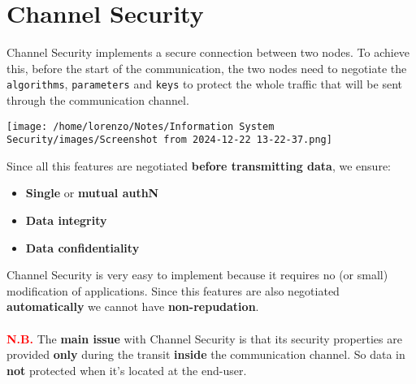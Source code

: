 \section{Channel Security}
\begin{minipage}{0.7\textwidth}
Channel Security implements a secure connection between two nodes. To achieve this, before the start of the communication, the two nodes need to negotiate the \texttt{algorithms}, \texttt{parameters} and \texttt{keys} to protect the whole traffic that will be sent through the communication channel.
\end{minipage} 
\hspace{0.5cm}
\begin{minipage}{0.3\textwidth}
    \centering
    \texttt{[image: /home/lorenzo/Notes/Information System Security/images/Screenshot from 2024-12-22 13-22-37.png]}
\end{minipage}
\noindent
Since all this features are negotiated \textbf{before transmitting data}, we ensure:
\begin{itemize}
    \item \textbf{Single} or \textbf{mutual authN}
    \item \textbf{Data integrity}
    \item \textbf{Data confidentiality}
\end{itemize}
Channel Security is very easy to implement because it requires no (or small) modification of applications. Since this features are also negotiated \textbf{automatically} we cannot have \textbf{non-repudation}.\\
\\
\textcolor{red}{\textbf{N.B.}} The \textbf{main issue} with Channel Security is that its security properties are provided \textbf{only} during the transit \textbf{inside} the communication channel. So data in \textbf{not} protected when it's located at the end-user. 

